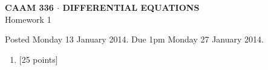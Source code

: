 \documentclass[10pt]{article}
\begin{document}
\vspace*{-5em}
\begin{center}
\large \textsf{\textbf{CAAM 336 $\cdot$ DIFFERENTIAL EQUATIONS}\\[0.5em]
Homework 1 }
\end{center}

Posted Monday 13 January 2014.  Due 1pm Monday 27 January 2014.

\begin{enumerate}\addtocounter{enumi}{0}
\item {[25 points]}  
\end{enumerate}
\end{document}
